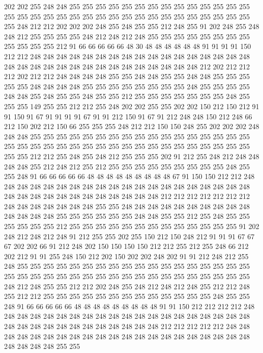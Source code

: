 202 202 255 248 248 255 255 255 255 255 255 255 255 255 255 255 255 255 255 255
255 255 255 255 255 255 255 255 255 255 255 255 255 255 255 255 255 255 255 248
212 212 202 202 202 248 255 248 255 255 212 248 255 91 202 248 255 248 248 212
255 255 255 255 248 212 248 212 248 255 255 255 255 255 255 255 255 255 255 255
255 212 91 66 66 66 66 66 48 30 48 48 48 48 48 48 91 91 91 91
150 212 212 248 248 248 248 248 248 248 248 248 248 248 248 248 248 248 248 248
248 248 248 248 248 248 248 248 248 248 248 248 248 248 248 212 202 212 212 212
202 212 212 248 248 248 248 255 255 248 248 255 255 248 248 255 255 255 255 255
248 248 248 248 255 255 255 255 255 255 255 255 248 255 255 255 255 248 248 255
248 255 255 248 255 255 212 255 255 255 255 255 255 255 248 255 255 255 149 255
255 212 212 255 248 202 202 255 255 202 202 150 212 150 212 91 91 150 91 67
91 91 91 91 67 91 91 212 150 91 67 91 212 248 248 150 212 248 66 212
150 202 212 150 66 255 255 255 248 212 212 150 150 248 255 202 202 202 248 248
248 255 255 255 255 255 255 255 255 255 255 255 255 255 255 255 255 255 255 255
255 255 255 255 255 255 255 255 255 255 255 255 255 255 255 255 255 255 255 212
212 255 248 255 248 212 255 255 255 202 91 212 255 248 212 248 248 248 248 255
212 248 212 255 212 255 255 255 255 255 255 255 255 255 248 255 255 248 91 66
66 66 66 66 48 48 48 48 48 48 48 48 48 67 91 150 150 212 212 248
248 248 248 248 248 248 248 248 248 248 248 248 248 248 248 248 248 248 248 248
248 248 248 248 248 248 248 248 248 248 248 212 212 212 212 212 212 212 248 248
248 248 248 248 248 255 255 248 248 248 248 248 248 248 248 248 248 248 248 248
248 255 255 255 255 255 255 248 248 255 255 212 255 248 255 255 255 255 255 255
212 255 255 255 255 255 255 255 255 255 255 255 255 255 91 202 248 212 248 212
248 91 212 255 255 202 255 150 212 150 248 212 91 91 91 67 67 67 202 202
66 91 212 248 202 150 150 150 150 212 212 255 212 255 248 66 212 202 212 91
91 255 248 150 212 202 150 202 202 248 202 91 91 212 248 212 255 248 255 255
255 255 255 255 255 255 255 255 255 255 255 255 255 255 255 255 255 255 255 255
255 255 255 255 255 255 255 255 255 255 255 255 255 255 255 248 212 248 255 255
212 212 202 248 255 248 212 248 212 248 255 212 212 248 255 212 212 255 255 255
255 255 255 255 255 255 255 255 255 255 248 255 255 248 91 66 66 66 66 66
48 48 48 48 48 48 48 48 48 91 91 150 212 212 212 212 248 248 248 248
248 248 248 248 248 248 248 248 248 248 248 248 248 248 248 248 248 248 248 248
248 248 248 248 248 248 248 248 212 212 212 212 212 248 248 248 248 248 248 248
248 248 248 248 248 248 248 248 248 248 248 248 248 248 248 248 248 248 255 255
